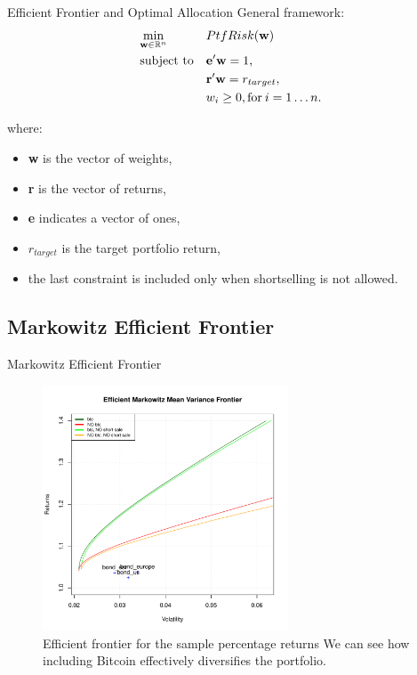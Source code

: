 \documentclass{beamer}
\begin{document}
\begin{frame}{Efficient  Frontier and Optimal Allocation}
General framework:
\begin{subequations}
	\begin{align}
	&\!\min_{\mathbf{w}\in \mathbb{R}^{n}}        & & PtfRisk(\mathbf{w}) \notag\\
	& \text{subject to} &      & \mathbf{e}'\mathbf{w} = 1 , \notag\\
	&                  &      & \mathbf{r}'\mathbf{w} = r_{target},\label{eq:constraint2} \notag\\
	&		 &        & w_{i} \geq 0, \text{for} \: i = 1\dots n. \notag
	\end{align}
\end{subequations}

where:
\begin{itemize}
	\item \textbf{w} is the vector of weights,
	\item \textbf{r} is the vector of returns,
	\item \textbf{e} indicates a vector of ones,
	\item $r_{target}$ is the target portfolio return,
	\item the last constraint is included only when shortselling is not allowed.
\end{itemize}
\end{frame}

\subsection{Markowitz Efficient Frontier}

\begin{frame}{Markowitz Efficient Frontier}
\begin{figure}
\includegraphics[width=0.65\textwidth]{frontier_markowitz_sample_percentage.pdf}
\caption{Efficient frontier for the sample percentage returns We can see how including Bitcoin effectively diversifies the portfolio.}
\end{figure}
\end{frame}
\end{document}
